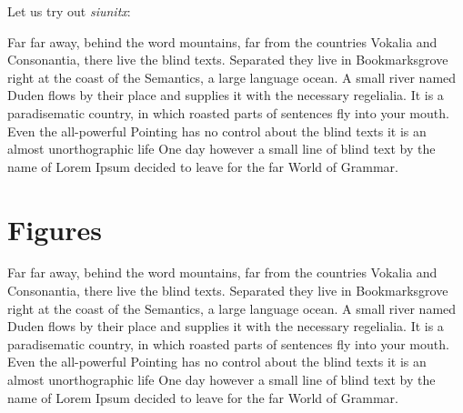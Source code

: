 Let us try out \emph{siunitx}: 


Far far away, behind the word mountains, far from the countries Vokalia and
Consonantia, there live the blind texts. Separated they live in
Bookmarksgrove right at the coast of the Semantics, a large language
ocean. A small river named Duden flows by their place and supplies it with
the necessary regelialia. It is a paradisematic country, in which roasted
parts of sentences fly into your mouth. Even the all-powerful Pointing has
no control about the blind texts it is an almost unorthographic life One
day however a small line of blind text by the name of Lorem Ipsum decided
to leave for the far World of Grammar.

\section{Figures}
\label{sec:figures}

Far far away, behind the word mountains, far from the countries Vokalia and
Consonantia, there live the blind texts. Separated they live in
Bookmarksgrove right at the coast of the Semantics, a large language
ocean. A small river named Duden flows by their place and supplies it with
the necessary regelialia. It is a paradisematic country, in which roasted
parts of sentences fly into your mouth. Even the all-powerful Pointing has
no control about the blind texts it is an almost unorthographic life One
day however a small line of blind text by the name of Lorem Ipsum decided
to leave for the far World of Grammar.

